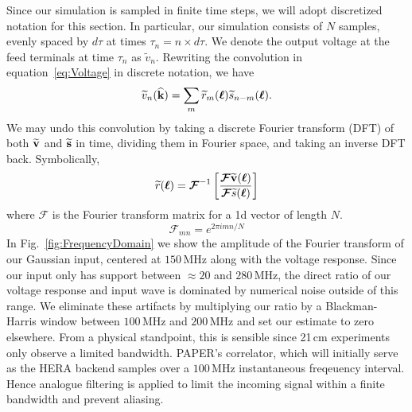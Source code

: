 \documentclass[twocolumn]{emulateapj}
\begin{document}
Since our simulation is sampled in finite time steps, we will adopt discretized notation for this section. In particular, our simulation consists of $N$ samples, evenly spaced by $d \tau$ at times $\tau_n = n \times d \tau$. 
We denote the output voltage at the feed terminals at time $\tau_n$ as $\widetilde{v}_n$. Rewriting the convolution in equation~\ref{eq:Voltage} in discrete notation, we have
\begin{equation}
\ftv_n({\bf \widehat{k}}) = \sum_m \ftr_m(\bl) \fts_{n-m}(\bl).
\end{equation}
We may undo this convolution by taking a discrete Fourier transform (DFT) of both ${\bf \widetilde{v}}$ and ${\bf \widetilde{s}}$ in time, dividing them in Fourier space, and taking an inverse DFT back. Symbolically,
\begin{equation}\label{eq:Inversion}
\ftr(\bl) = \boldsymbol{\mathcal{F}}^{-1} \left[ \frac{\boldsymbol{\mathcal{F}} {\bf \widetilde{v}}(\bl)}{\boldsymbol{\mathcal{F}}{\fts}(\bl)} \right] 
\end{equation}
where $\boldsymbol{\mathcal{F}}$ is the Fourier transform matrix for a 1d vector of length $N$. 
\begin{equation}
\boldsymbol{\mathcal{F}}_{mn} = e^{2 \pi i m n /N}
\end{equation}
In Fig.~\ref{fig:FrequencyDomain} we show the amplitude of the Fourier transform of our Gaussian input, centered at $150$\,MHz along with the voltage response. Since our input only has support between $\approx 20$ and $280$\,MHz, the direct ratio of our voltage response and input wave is dominated by numerical noise outside of this range. We eliminate these artifacts by multiplying our ratio by a Blackman-Harris window between $100$\,MHz and $200$\,MHz and set our estimate to zero elsewhere. From a physical standpoint, this is sensible since 21\,cm experiments only observe a limited bandwidth. PAPER's correlator, which will initially serve as the HERA backend samples over a $100$\,MHz instantaneous freqeuency interval. Hence analogue filtering is applied to limit the incoming signal within a finite bandwidth and prevent aliasing.
\end{document}
